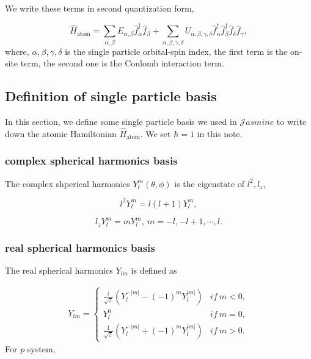 We write these terms in second quantization form, 

\begin{equation}
\hat{H}_{\text{atom}}=\sum_{\alpha,\beta}E_{\alpha,\beta}\hat{f}_{\alpha}^{\dagger}\hat{f}_{\beta}+\sum_{\alpha,\beta,\gamma,\delta}U_{\alpha,\beta,\gamma,\delta}\hat{f}_{\alpha}^{\dagger}\hat{f}_{\beta}^{\dagger}\hat{f}_{\delta}\hat{f}_{\gamma},
\end{equation}
where, $\alpha,\beta,\gamma,\delta$ is the single particle orbital-spin
index, the first term is the on-site term, the second one is the Coulomb
interaction term.


\subsection{Definition of single particle basis}

In this section, we define some single particle basis we used in $\mathcal{J}asmine$
to write down the atomic Hamiltonian $\hat{H}_{\text{atom}}$. We
set $\hbar=1$ in this note.


\subsubsection{complex spherical harmonics basis}

The complex shperical harmonics $Y_{l}^{m}(\theta,\phi)$ is the eigenstate
of $l^{2},l_{z}$,

\begin{equation}
l^{2}Y_{l}^{m}=l(l+1)Y_{l}^{m},
\end{equation}


\begin{equation}
l_{z}Y_{l}^{m}=mY_{l}^{m},\ m=-l,-l+1,\cdots,l.
\end{equation}



\subsubsection{real spherical harmonics basis}

The real spherical harmonics $Y_{lm}$ is defined as

\begin{gather}
Y_{lm}=\begin{cases}
\frac{i}{\sqrt{2}}\left(Y_{l}^{-|m|}-(-1)^{m}Y_{l}^{|m|}\right) & if\ m<0,\\
Y_{l}^{0} & if\ m=0,\\
\frac{1}{\sqrt{2}}\left(Y_{l}^{-|m|}+(-1)^{m}Y_{l}^{|m|}\right) & if\ m>0.
\end{cases}
\end{gather}
For $p$ system,

